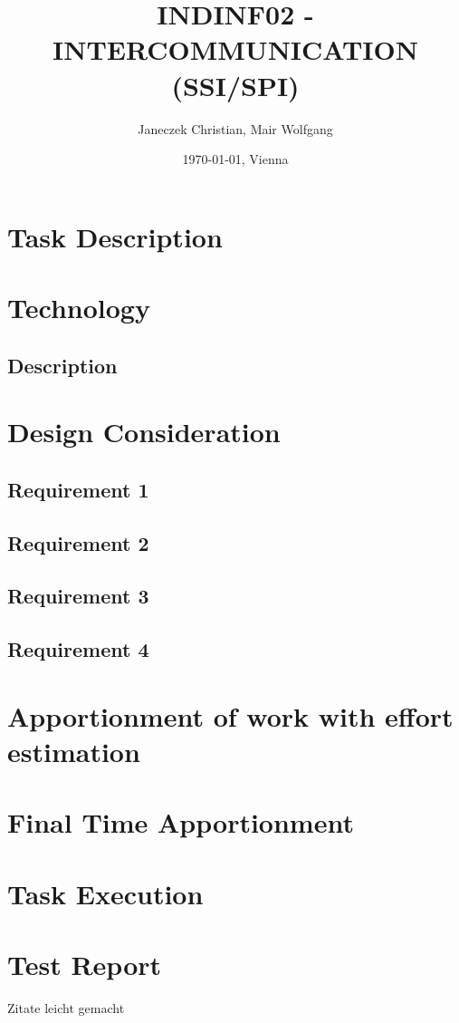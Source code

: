 \documentclass[11pt,a4paper]{article}
\title{INDINF02 - INTERCOMMUNICATION (SSI/SPI)}
\author{Janeczek Christian, Mair Wolfgang}
\affil{IT Department TGM, Vienna}
\date{\today{}, Vienna}
\begin{document}
\maketitle
\newpage
\tableofcontents
\newpage

\section{Task Description}
\newpage

\section{Technology}
\subsection{Description}
\newpage

\section{Design Consideration}
\subsection{Requirement 1}
\subsection{Requirement 2}
\subsection{Requirement 3}
\subsection{Requirement 4}
\newpage

\section{Apportionment of work with effort estimation}
\newpage

\section{Final Time Apportionment}
\newpage

\section{Task Execution}
\newpage

\section{Test Report}
\newpage

\begin{thebibliography}{999}
	 Zitate leicht gemacht
\end{thebibliography}
\end{document}
